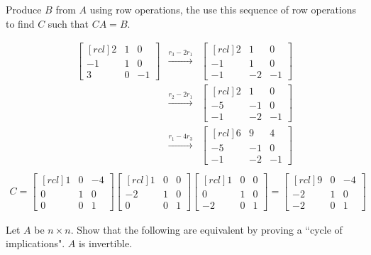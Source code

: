 Produce $B$ from $A$ using row operations, the use this sequence of row operations to find $C$ such that $CA =B$.
\\
\begin{solution}
\begin{eqnarray*}
\begin{bmatrix}[rcl]
2&1&0\\
-1&1&0\\
3&0&-1
\end{bmatrix}
&\xrightarrow[]{r_3 - 2r_1}&
\begin{bmatrix}[rcl]
2&1&0\\
-1&1&0\\
-1&-2&-1
\end{bmatrix}
\\
&\xrightarrow[]{r_2 - 2r_1}&
\begin{bmatrix}[rcl]
2&1&0\\
-5&-1&0\\
-1&-2&-1
\end{bmatrix}
\\
&\xrightarrow[]{r_1 - 4r_3}&
\begin{bmatrix}[rcl]
6&9&4\\
-5&-1&0\\
-1&-2&-1
\end{bmatrix}\\
\end{eqnarray*}
\begin{eqnarray*}
C =
\begin{bmatrix}[rcl]
1&0&-4\\
0&1&0\\
0&0&1
\end{bmatrix}
\begin{bmatrix}[rcl]
1&0&0\\
-2&1&0\\
0&0&1
\end{bmatrix}
\begin{bmatrix}[rcl]
1&0&0\\
0&1&0\\
-2&0&1
\end{bmatrix}
=
\begin{bmatrix}[rcl]
9&0&-4\\
-2&1&0\\
-2&0&1
\end{bmatrix}
\end{eqnarray*}
\end{solution}
\ii Let $A$ be $n\times n$. Show that the following are equivalent by proving a ``cycle of implications".
\bb[(i)]
\ii $A$ is invertible.
